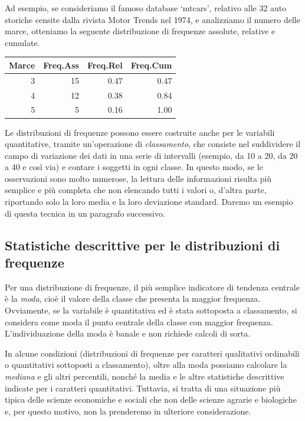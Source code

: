 \documentclass[a4paper,12pt,oneside]{book}
\begin{document}
Ad esempio, se consideriamo il famoso database `mtcars', relativo alle 32 auto storiche censite dalla rivista Motor Trends nel 1974, e analizziamo il numero delle marce, otteniamo la seguente distribuzione di frequenze assolute, relative e cumulate.

\begin{tabular}{r|r|r|r}
\hline
Marce & Freq.Ass & Freq.Rel & Freq.Cum\\
\hline
3 & 15 & 0.47 & 0.47\\
\hline
4 & 12 & 0.38 & 0.84\\
\hline
5 & 5 & 0.16 & 1.00\\
\hline
\end{tabular}

Le distribuzioni di frequenze possono essere costruite anche per le variabili quantitative, tramite un'operazione di \emph{classamento}, che consiste nel suddividere il campo di variazione dei dati in una serie di intervalli (esempio, da 10 a 20, da 20 a 40 e così via) e contare i soggetti in ogni classe. In questo modo, se le osservazioni sono molto numerose, la lettura delle informazioni risulta più semplice e più completa che non elencando tutti i valori o, d'altra parte, riportando solo la loro media e la loro deviazione standard. Daremo un esempio di questa tecnica in un paragrafo successivo.

\hypertarget{statistiche-descrittive-per-le-distribuzioni-di-frequenze}{%
\subsection{Statistiche descrittive per le distribuzioni di frequenze}\label{statistiche-descrittive-per-le-distribuzioni-di-frequenze}}

Per una distribuzione di frequenze, il più semplice indicatore di tendenza centrale è la \emph{moda}, cioè il valore della classe che presenta la maggior frequenza. Ovviamente, se la variabile è quantitativa ed è stata sottoposta a classamento, si considera come moda il punto centrale della classe con maggior frequenza. L'individuazione della moda è banale e non richiede calcoli di sorta.

In alcune condizioni (distribuzioni di frequenze per caratteri qualitativi ordinabili o quantitativi sottoposti a classamento), oltre alla moda possiamo calcolare la \emph{mediana} e gli altri percentili, nonché la media e le altre statistiche descrittive indicate per i caratteri quantitativi. Tuttavia, si tratta di una situazione più tipica delle scienze economiche e sociali che non delle scienze agrarie e biologiche e, per questo motivo, non la prenderemo in ulteriore considerazione.
\end{document}
